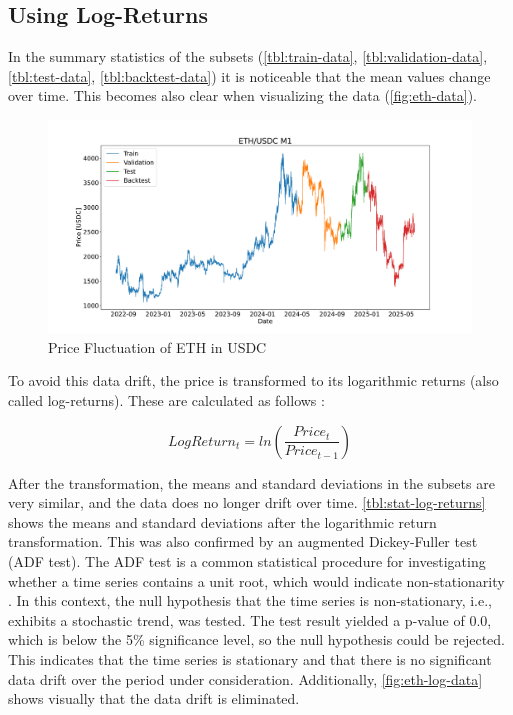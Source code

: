 \subsection{Using Log-Returns}
\label{chap:log-returns}

In the summary statistics of the subsets (\autoref{tbl:train-data}, \autoref{tbl:validation-data}, \autoref{tbl:test-data}, \autoref{tbl:backtest-data}) it is noticeable that the mean values change over time.
This becomes also clear when visualizing the data (\autoref{fig:eth-data}).

\begin{figure}[H]
    \centering
    \includegraphics[width=\textwidth]{images/eda/ethusdc_price}
    \caption{Price Fluctuation of ETH in USDC}
    \label{fig:eth-data}
\end{figure}

\noindent
To avoid this data drift, the price is transformed to its logarithmic returns (also called log-returns).
These are calculated as follows \cite{log-returns}:

\[
    LogReturn_t = ln(\frac{Price_t}{Price_{t-1}})
\]

\noindent
After the transformation, the means and standard deviations in the subsets are very similar, and the data does no longer drift over time.
\autoref{tbl:stat-log-returns} shows the means and standard deviations after the logarithmic return transformation.
This was also confirmed by an augmented Dickey-Fuller test (ADF test).
The ADF test is a common statistical procedure for investigating whether a time series contains a unit root, which would indicate non-stationarity \cite{adf}.
In this context, the null hypothesis that the time series is non-stationary, i.e., exhibits a stochastic trend, was tested.
The test result yielded a p-value of 0.0, which is below the 5\% significance level, so the null hypothesis could be rejected.
This indicates that the time series is stationary and that there is no significant data drift over the period under consideration.
Additionally, \autoref{fig:eth-log-data} shows visually that the data drift is eliminated.

